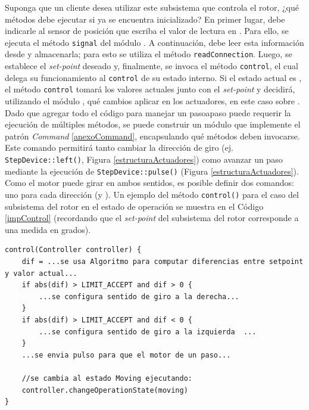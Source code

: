 Suponga que un cliente desea utilizar este subsistema que controla el rotor, ¿qué métodos debe ejecutar si ya se encuentra inicializado?
En primer lugar, debe indicarle al sensor de posición que escriba el valor de lectura en \Pipe. Para ello, se ejecuta el método \verb|signal| del módulo \SensorPosRotor. A continuación, \RotorCtrl debe leer esta información desde \Pipe y almacenarla; para esto se utiliza el método \verb|readConnection|. Luego, se establece el \textit{set-point} deseado y, finalmente, se invoca el método \verb|control|, el cual delega su funcionamiento al \verb|control| de su estado interno. Si el estado actual es \Waiting, el método \verb|control| tomará los valores actuales junto con el \textit{set-point} y decidirá, utilizando el módulo \Algoritmo, qué cambios aplicar en los actuadores, en este caso sobre \Rotor. Dado que agregar todo el código para manejar un \gls{pasoapaso} puede requerir la ejecución de múltiples métodos, se puede construir un módulo que implemente el patrón \textit{Command} \ref{anexoCommand}, encapsulando qué métodos deben invocarse. Este comando permitirá tanto cambiar la dirección de giro (ej. \verb|StepDevice::left()|, Figura \ref{estructuraActuadores}) como avanzar un paso mediante la ejecución de \verb|StepDevice::pulse()| (Figura \ref{estructuraActuadores}). Como el motor puede girar en ambos sentidos, es posible definir dos comandos: uno para cada dirección (\CmdRotorLeft y \CmdRotorRight). Un ejemplo del método \verb|control()| para el caso del subsistema del rotor en el estado de operación \Waiting se muestra en el Código \ref{impControl} (recordando que el \textit{set-point} del subsistema del rotor corresponde a una medida en grados).


\begin{lstlisting}[caption=Ejemplo de implementación del método control del módulo \Waiting.,label={impControl}]
control(Controller controller) {
    dif = ...se usa Algoritmo para computar diferencias entre setpoint y valor actual...
    if abs(dif) > LIMIT_ACCEPT and dif > 0 {
        ...se configura sentido de giro a la derecha...
    }
    if abs(dif) > LIMIT_ACCEPT and dif < 0 {
        ...se configura sentido de giro a la izquierda  ...      
    }
    ...se envia pulso para que el motor de un paso...

    //se cambia al estado Moving ejecutando:
    controller.changeOperationState(moving)
}
\end{lstlisting}

